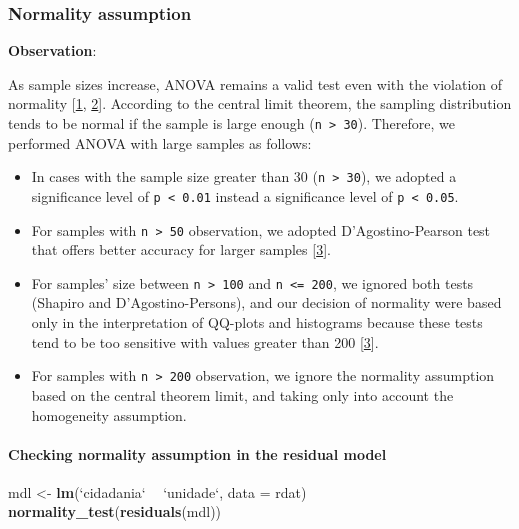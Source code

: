 \documentclass[]{article}
\newenvironment{Shaded}{\begin{snugshade}}{\end{snugshade}}
\newcommand{\DataTypeTok}[1]{\textcolor[rgb]{0.13,0.29,0.53}{#1}}
\newcommand{\KeywordTok}[1]{\textcolor[rgb]{0.13,0.29,0.53}{\textbf{#1}}}
\newcommand{\NormalTok}[1]{#1}
\newcommand{\OperatorTok}[1]{\textcolor[rgb]{0.81,0.36,0.00}{\textbf{#1}}}
\newcommand{\StringTok}[1]{\textcolor[rgb]{0.31,0.60,0.02}{#1}}
\let\oldparagraph\paragraph
\renewcommand{\paragraph}[1]{\oldparagraph{#1}\mbox{}}
\begin{document}
\hypertarget{normality-assumption}{%
\subsubsection{Normality assumption}\label{normality-assumption}}

\textbf{Observation}:

As sample sizes increase, ANOVA remains a valid test even with the
violation of normality {[}\protect\hyperlink{references}{1},
\protect\hyperlink{references}{2}{]}. According to the central limit
theorem, the sampling distribution tends to be normal if the sample is
large enough (\texttt{n\ \textgreater{}\ 30}). Therefore, we performed
ANOVA with large samples as follows:

\begin{itemize}
\item
  In cases with the sample size greater than 30
  (\texttt{n\ \textgreater{}\ 30}), we adopted a significance level of
  \texttt{p\ \textless{}\ 0.01} instead a significance level of
  \texttt{p\ \textless{}\ 0.05}.
\item
  For samples with \texttt{n\ \textgreater{}\ 50} observation, we
  adopted D'Agostino-Pearson test that offers better accuracy for larger
  samples {[}\protect\hyperlink{references}{3}{]}.
\item
  For samples' size between \texttt{n\ \textgreater{}\ 100} and
  \texttt{n\ \textless{}=\ 200}, we ignored both tests (Shapiro and
  D'Agostino-Persons), and our decision of normality were based only in
  the interpretation of QQ-plots and histograms because these tests tend
  to be too sensitive with values greater than 200
  {[}\protect\hyperlink{references}{3}{]}.
\item
  For samples with \texttt{n\ \textgreater{}\ 200} observation, we
  ignore the normality assumption based on the central theorem limit,
  and taking only into account the homogeneity assumption.
\end{itemize}

\hypertarget{checking-normality-assumption-in-the-residual-model}{%
\paragraph{Checking normality assumption in the residual
model}\label{checking-normality-assumption-in-the-residual-model}}

\begin{Shaded}
\begin{Highlighting}[]
\NormalTok{mdl <-}\StringTok{ }\KeywordTok{lm}\NormalTok{(}\StringTok{`}\DataTypeTok{cidadania}\StringTok{`} \OperatorTok{~}\StringTok{ `}\DataTypeTok{unidade}\StringTok{`}\NormalTok{, }\DataTypeTok{data =}\NormalTok{ rdat)}
\KeywordTok{normality_test}\NormalTok{(}\KeywordTok{residuals}\NormalTok{(mdl))}
\end{Highlighting}
\end{Shaded}
\end{document}

